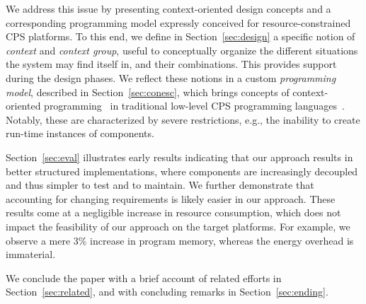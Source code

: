We address this issue by presenting context-oriented design concepts
and a corresponding programming model expressly conceived for
resource-constrained CPS platforms. To this end, we define in
Section~\ref{sec:design} a specific notion of \emph{context} and
\emph{context group}, useful to conceptually organize the different
situations the system may find itself in, and their combinations. This
provides support during the design phases. We reflect these notions in
a custom \emph{programming model}, described in
Section~\ref{sec:conesc}, which brings concepts of context-oriented
programming~\cite{Hirschfeld08} in traditional low-level CPS programming
languages~\cite{gay03nesc}. Notably, these are characterized by severe restrictions,
e.g., the inability to create run-time instances of components.

Section~\ref{sec:eval} illustrates early results indicating that our
approach results in better structured implementations, where
components are increasingly decoupled and thus simpler to test and to
maintain. We further demonstrate that accounting for changing
requirements is likely easier in our approach. These results come at a
negligible increase in resource consumption, which does not impact the
feasibility of our approach on the target platforms. For example, we
observe a mere 3\% increase in program memory, whereas the energy
overhead is immaterial.

We conclude the paper with a brief account of related efforts in
Section~\ref{sec:related}, and with concluding remarks in
Section~\ref{sec:ending}.







